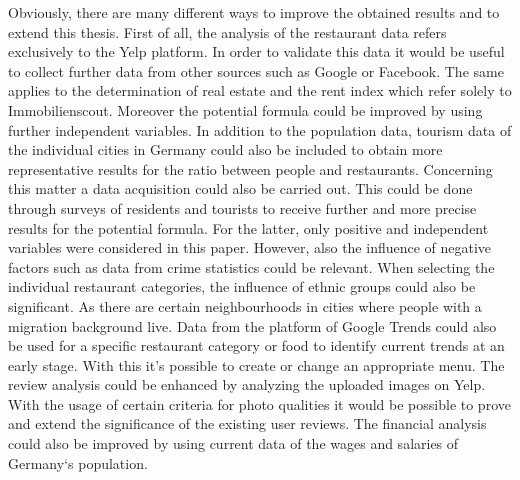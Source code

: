 Obviously, there are many different ways to improve the obtained results and to extend this thesis. First of all, the analysis of the restaurant data refers exclusively to the Yelp platform. In order to validate this data it would be useful to collect further data from other sources such as Google or Facebook. The same applies to the determination of real estate and the rent index which refer solely to Immobilienscout. \newline
Moreover the potential formula could be improved by using further independent variables. In addition to the population data, tourism data of the individual cities in Germany could also be included to obtain more representative results for the ratio between people and restaurants. Concerning this matter a data acquisition could also be carried out. This could be done through surveys of residents and tourists to receive further and more precise results for the potential formula. For the latter, only positive and independent variables were considered in this paper. However, also the influence of negative factors such as data from crime statistics could be relevant. \newline
When selecting the individual restaurant categories, the influence of ethnic groups could also be significant. As there are certain neighbourhoods in cities where people with a migration background live. Data from the platform of Google Trends could also be used for a specific restaurant category or food to identify current trends at an early stage. With this it's possible to create or change an appropriate menu. \newline
The review analysis could be enhanced by analyzing the uploaded images on Yelp. With the usage of certain criteria for photo qualities it would be possible to prove and extend the significance of the existing user reviews. The financial analysis could also be improved by using current data of the wages and salaries of Germany‘s population.